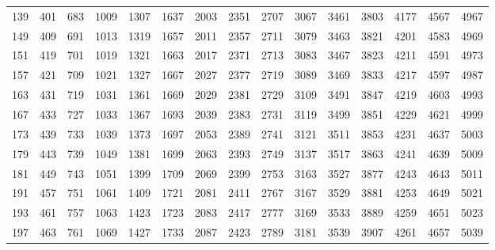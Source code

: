 \begin{tabular}{rrrrrrrrrrrrrrr}
  139 &   401 &   683 &  1009 &  1307 &  1637 &  2003 &  2351 &  2707 &  3067 &  3461 &  3803 &  4177 &  4567 &  4967 \\
  149 &   409 &   691 &  1013 &  1319 &  1657 &  2011 &  2357 &  2711 &  3079 &  3463 &  3821 &  4201 &  4583 &  4969 \\
  151 &   419 &   701 &  1019 &  1321 &  1663 &  2017 &  2371 &  2713 &  3083 &  3467 &  3823 &  4211 &  4591 &  4973 \\
  157 &   421 &   709 &  1021 &  1327 &  1667 &  2027 &  2377 &  2719 &  3089 &  3469 &  3833 &  4217 &  4597 &  4987 \\
  163 &   431 &   719 &  1031 &  1361 &  1669 &  2029 &  2381 &  2729 &  3109 &  3491 &  3847 &  4219 &  4603 &  4993 \\
  167 &   433 &   727 &  1033 &  1367 &  1693 &  2039 &  2383 &  2731 &  3119 &  3499 &  3851 &  4229 &  4621 &  4999 \\
  173 &   439 &   733 &  1039 &  1373 &  1697 &  2053 &  2389 &  2741 &  3121 &  3511 &  3853 &  4231 &  4637 &  5003 \\
  179 &   443 &   739 &  1049 &  1381 &  1699 &  2063 &  2393 &  2749 &  3137 &  3517 &  3863 &  4241 &  4639 &  5009 \\
  181 &   449 &   743 &  1051 &  1399 &  1709 &  2069 &  2399 &  2753 &  3163 &  3527 &  3877 &  4243 &  4643 &  5011 \\
  191 &   457 &   751 &  1061 &  1409 &  1721 &  2081 &  2411 &  2767 &  3167 &  3529 &  3881 &  4253 &  4649 &  5021 \\
  193 &   461 &   757 &  1063 &  1423 &  1723 &  2083 &  2417 &  2777 &  3169 &  3533 &  3889 &  4259 &  4651 &  5023 \\
  197 &   463 &   761 &  1069 &  1427 &  1733 &  2087 &  2423 &  2789 &  3181 &  3539 &  3907 &  4261 &  4657 &  5039
\end{tabular}
\endgroup

